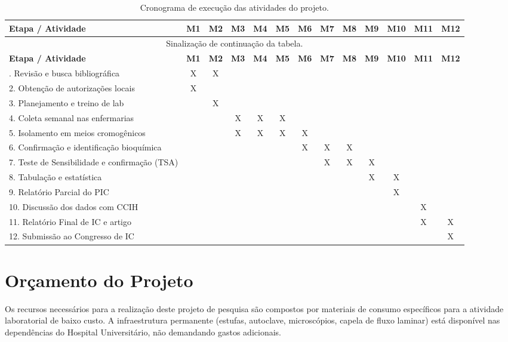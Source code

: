 \documentclass[12pt,a4paper]{article}
\begin{document}
\begin{spacing}{1.0}
\begin{longtable}{lcccccccccccc}
\caption{Cronograma de execução das atividades do projeto.}\\
\toprule
\textbf{Etapa / Atividade} & \textbf{M1} & \textbf{M2} & \textbf{M3} & \textbf{M4} & \textbf{M5} & \textbf{M6} & \textbf{M7} & \textbf{M8} & \textbf{M9} & \textbf{M10} & \textbf{M11} & \textbf{M12} \\
\midrule
\endfirsthead
\multicolumn{13}{c}{Sinalização de continuação da tabela.}\\
\toprule
\textbf{Etapa / Atividade} & \textbf{M1} & \textbf{M2} & \textbf{M3} & \textbf{M4} & \textbf{M5} & \textbf{M6} & \textbf{M7} & \textbf{M8} & \textbf{M9} & \textbf{M10} & \textbf{M11} & \textbf{M12} \\
\midrule
\endhead
\bottomrule
\endfoot
1. Revisão e busca bibliográfica & X & X & & & & & & & & & & \\
2. Obtenção de autorizações locais & X & & & & & & & & & & & \\
3. Planejamento e treino de lab & & X & & & & & & & & & & \\
4. Coleta semanal nas enfermarias & & & X & X & X & & & & & & & \\
5. Isolamento em meios cromogênicos & & & X & X & X & X & & & & & & \\
6. Confirmação e identificação bioquímica & & & & & & X & X & X & & & & \\
7. Teste de Sensibilidade e confirmação (TSA) & & & & & & & X & X & X & & & \\
8. Tabulação e estatística & & & & & & & & & X & X & & \\
9. Relatório Parcial do PIC & & & & & & & & & & X & & \\
10. Discussão dos dados com CCIH & & & & & & & & & & & X & \\
11. Relatório Final de IC e artigo & & & & & & & & & & & X & X \\
12. Submissão ao Congresso de IC & & & & & & & & & & & & X \\
\bottomrule
\end{longtable}
\end{spacing}
\newpage

\section{Orçamento do Projeto}
Os recursos necessários para a realização deste projeto de pesquisa são compostos por materiais de consumo específicos para a atividade laboratorial de baixo custo. A infraestrutura permanente (estufas, autoclave, microscópios, capela de fluxo laminar) está disponível nas dependências do Hospital Universitário, não demandando gastos adicionais.
\end{document}
